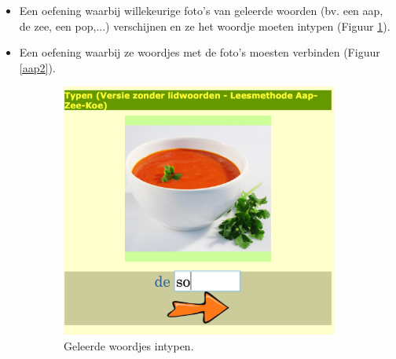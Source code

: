 \documentclass[a4paper,11pt]{article}
\theoremstyle{definition}
\begin{document}
\begin{itemize}
\begin{itemize}
\begin{itemize}
  \item Een oefening waarbij willekeurige foto's van geleerde woorden (bv. een aap, de zee, een pop,...) verschijnen 
  en ze het woordje moeten intypen (Figuur \ref{aap1}).
  \item Een oefening waarbij ze woordjes met de foto's moesten verbinden (Figuur \ref{aap2}). 
 \end{itemize}
 \begin{figure}[h!]
        \centering
        \begin{subfigure}{.5\textwidth}
          \centering
                \includegraphics[scale=0.15]{aap1.jpg}
                \caption{Geleerde woordjes intypen.}
                \label{aap1}
        \end{subfigure}%
        \begin{subfigure}{.5\textwidth}
           \centering

\end{subfigure}
\end{figure}
\end{itemize}
\end{itemize}
\end{document}
